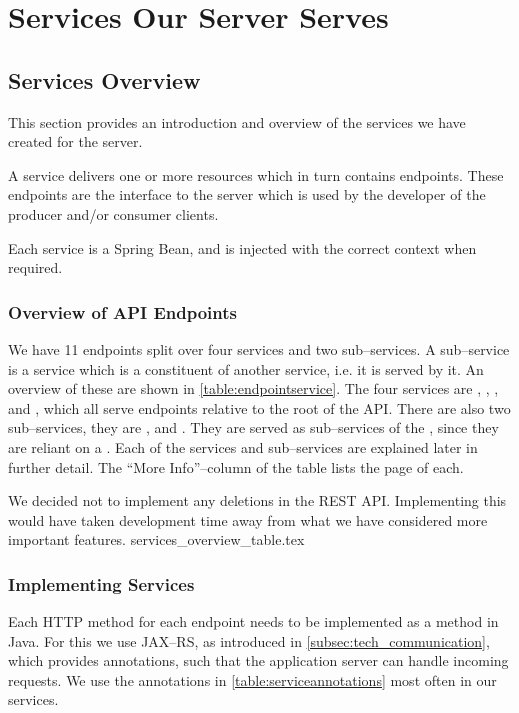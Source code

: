 \chapter{Services Our Server Serves}
\section{Services Overview}\label{sec:services_overview}
This section provides an introduction and overview of the services we have created for the server.

A service delivers one or more resources which in turn contains endpoints.
These endpoints are the interface to the server which is used by the developer of the producer and/or consumer clients.

Each service is a Spring Bean, and is injected with the correct context when required. 

\subsection{Overview of API Endpoints}
We have 11 endpoints split over four services and two sub--services.
A sub--service is a service which is a constituent of another service, i.e. it is served by it.
An overview of these are shown in \cref{table:endpointservice}.
The four services are , , , and , 
which all serve endpoints relative to the root of the API.
There are also two sub--services, they are , and .
They are served as sub--services of the , since they are reliant on a .
Each of the services and sub--services are explained later in further detail.
The ``More Info''--column of the table lists the page of each.

We decided not to implement any deletions in the REST API.
Implementing this would have taken development time away from what we have considered more important features. 
{services_overview_table.tex}

\subsection{Implementing Services}
Each HTTP method for each endpoint needs to be implemented as a method in Java.
For this we use JAX--RS, as introduced in \cref{subsec:tech_communication}, which provides annotations, such that the application server can handle incoming requests.
We use the annotations in \cref{table:serviceannotations} most often in our services.

